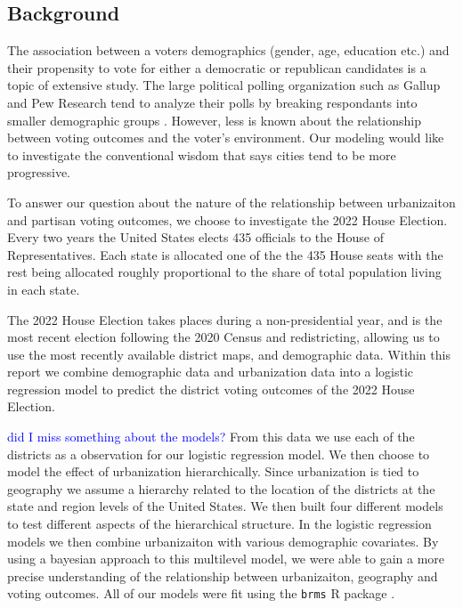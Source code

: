 \documentclass[12pt]{article}
\newcommand{\blue}[1]{\textcolor{blue}{#1}}
\begin{document}
\subsection*{Background}
The association between a voters demographics (gender, age, education etc.) and their propensity to vote for either a democratic or republican candidates is a topic of extensive study. The large political polling organization such as Gallup and Pew Research tend to analyze their polls by breaking respondants into smaller demographic groups \parencite{pew2020}. However, less is known about the relationship between voting outcomes and the voter's environment. Our modeling would like to investigate the conventional wisdom that says cities tend to be more progressive. 

To answer our question about the nature of the relationship between urbanizaiton and partisan voting outcomes, we choose to investigate the 2022 House Election. Every two years the United States elects 435 officials to the House of Representatives. Each state is allocated one of the the 435 House seats with the rest being allocated roughly proportional to the share of total population living in each state. 

The 2022 House Election takes places during a non-presidential year, and is the most recent election following the 2020 Census and redistricting, allowing us to use the most recently available district maps, and demographic data. Within this report we combine demographic data and urbanization data into a logistic regression model to predict the district voting outcomes of the 2022 House Election. 

\blue{did I miss something about the models?}
From this data we use each of the districts as a observation for our logistic regression model. We then choose to model the effect of urbanization hierarchically. Since urbanization is tied to geography we assume a hierarchy related to the location of the districts at the state and region levels of the United States. We then built four different models to test different aspects of the hierarchical structure. In the logistic regression  models we then combine urbanizaiton with various demographic covariates. By using a bayesian approach to this multilevel model, we were able to gain a more precise understanding of the relationship between urbanizaiton, geography and voting outcomes. All of our models were fit using the \texttt{brms} R package \parencite{brms}. 



\end{document}
